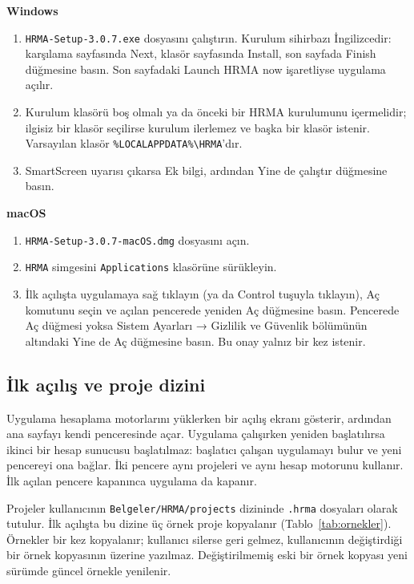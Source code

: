 \documentclass[11pt,a4paper]{article}
\newcommand{\ui}[1]{\textsf{#1}}
\newcommand{\kod}[1]{\texttt{#1}}
\begin{document}
\textbf{Windows}
\begin{enumerate}[leftmargin=1.6em]
  \item \kod{HRMA-Setup-3.0.7.exe} dosyasını çalıştırın. Kurulum sihirbazı
  İngilizcedir: karşılama sayfasında \ui{Next}, klasör sayfasında
  \ui{Install}, son sayfada \ui{Finish} düğmesine basın. Son sayfadaki
  \ui{Launch HRMA now} işaretliyse uygulama açılır.
  \item Kurulum klasörü boş olmalı ya da önceki bir HRMA kurulumunu içermelidir;
  ilgisiz bir klasör seçilirse kurulum ilerlemez ve başka bir klasör istenir.
  Varsayılan klasör \kod{\%LOCALAPPDATA\%\textbackslash{}HRMA}'dır.
  \item SmartScreen uyarısı çıkarsa \ui{Ek bilgi}, ardından \ui{Yine de çalıştır}
  düğmesine basın.
\end{enumerate}

\textbf{macOS}
\begin{enumerate}[leftmargin=1.6em]
  \item \kod{HRMA-Setup-3.0.7-macOS.dmg} dosyasını açın.
  \item \kod{HRMA} simgesini \kod{Applications} klasörüne sürükleyin.
  \item İlk açılışta uygulamaya sağ tıklayın (ya da Control tuşuyla tıklayın),
  \ui{Aç} komutunu seçin ve açılan pencerede yeniden \ui{Aç} düğmesine basın.
  Pencerede \ui{Aç} düğmesi yoksa \ui{Sistem Ayarları} → \ui{Gizlilik ve
  Güvenlik} bölümünün altındaki \ui{Yine de Aç} düğmesine basın. Bu onay
  yalnız bir kez istenir.
\end{enumerate}

\subsection{İlk açılış ve proje dizini}

Uygulama hesaplama motorlarını yüklerken bir açılış ekranı gösterir, ardından
ana sayfayı kendi penceresinde açar. Uygulama çalışırken yeniden
başlatılırsa ikinci bir hesap sunucusu başlatılmaz: başlatıcı çalışan
uygulamayı bulur ve yeni pencereyi ona bağlar. İki pencere aynı projeleri ve
aynı hesap motorunu kullanır. İlk açılan pencere kapanınca uygulama da kapanır.

Projeler kullanıcının \kod{Belgeler/\allowbreak{}HRMA/\allowbreak{}projects} dizininde \kod{.hrma}
dosyaları olarak tutulur. İlk açılışta bu dizine üç örnek proje kopyalanır
(Tablo~\ref{tab:ornekler}). Örnekler bir kez kopyalanır; kullanıcı silerse geri
gelmez, kullanıcının değiştirdiği bir örnek kopyasının üzerine yazılmaz.
Değiştirilmemiş eski bir örnek kopyası yeni sürümde güncel örnekle yenilenir.
\end{document}
